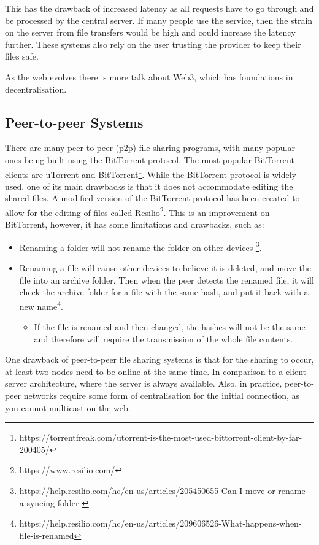 \documentclass[12pt]{report}
\begin{document}
This has the drawback of increased latency as all requests have to go through and be processed by the central server. If many people use the service, then the strain on the server from file transfers would be high and could increase the latency further. These systems also rely on the user trusting the provider to keep their files safe. \par

As the web evolves there is more talk about Web3\cite{WhatIsWeb3}, which has foundations in decentralisation.
\subsection{Peer-to-peer Systems}
There are many peer-to-peer (p2p) file-sharing programs, with many popular ones being built using the BitTorrent protocol. The most popular BitTorrent clients are uTorrent and BitTorrent\footnote{https://torrentfreak.com/utorrent-is-the-most-used-bittorrent-client-by-far-200405/}. While the BitTorrent protocol is widely used, one of its main drawbacks is that it does not accommodate editing the shared files. A modified version of the  BitTorrent protocol has been created to allow for the editing of files called Resilio\footnote{https://www.resilio.com/}. This is an improvement on BitTorrent, however, it has some limitations and drawbacks, such as:
\begin{itemize}
    \item Renaming a folder will not rename the folder on other devices \footnote{https://help.resilio.com/hc/en-us/articles/205450655-Can-I-move-or-rename-a-syncing-folder-}.
    \item Renaming a file will cause other devices to believe it is deleted, and move the file into an archive folder. Then when the peer detects the renamed file, it will check the archive folder for a file with the same hash, and put it back with a new name\footnote{https://help.resilio.com/hc/en-us/articles/209606526-What-happens-when-file-is-renamed}.
          \begin{itemize}
              \item If the file is renamed and then changed, the hashes will not be the same and therefore will require the transmission of the whole file contents.
          \end{itemize}
\end{itemize}  \par
One drawback of peer-to-peer file sharing systems is that for the sharing to occur, at least two nodes need to be online at the same time. In comparison to a client-server architecture, where the server is always available. Also, in practice, peer-to-peer networks require some form of centralisation for the initial connection, as you cannot multicast on the web.
\end{document}
